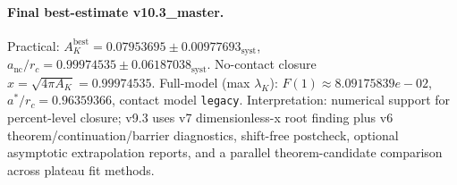 \paragraph{Final best-estimate v10.3_master.}
Practical: $A_K^{\mathrm{best}} = 0.07953695 \pm 0.00977693_{\mathrm{syst}}$, $a_{\mathrm{nc}}/r_c = 0.99974535 \pm 0.06187038_{\mathrm{syst}}$.
No-contact closure $x = \sqrt{4\pi A_K} = 0.99974535$.
Full-model (max $\lambda_K$): $F(1) \approx 8.09175839e-02$, $a^*/r_c = 0.96359366$, contact model \texttt{legacy}.
Interpretation: numerical support for percent-level closure; v9.3 uses v7 dimensionless-x root finding plus v6 theorem/continuation/barrier diagnostics, shift-free postcheck, optional asymptotic extrapolation reports, and a parallel theorem-candidate comparison across plateau fit methods.

